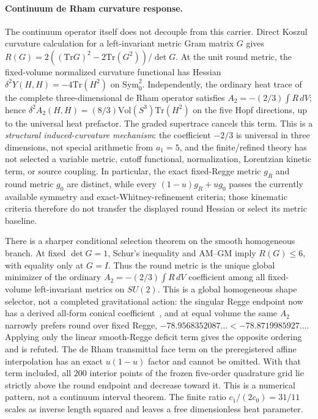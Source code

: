 \documentclass[12pt,a4paper]{article}
\theoremstyle{definition}
\begin{document}
\paragraph{Continuum de Rham curvature response.}
The continuum operator itself does not decouple from this carrier.  Direct Koszul curvature calculation for a left-invariant metric Gram matrix $G$ gives $R(G)=2((\mathrm{Tr}G)^2-2\mathrm{Tr}(G^2))/\det G$.  At the unit round metric, the fixed-volume normalized curvature functional has Hessian $\delta^2Y(H,H)=-4\mathrm{Tr}(H^2)$ on $\mathrm{Sym}^2_0$.  Independently, the ordinary heat trace of the complete three-dimensional de Rham operator satisfies $A_2=-(2/3)\int R\,dV$; hence $\delta^2A_2(H,H)=(8/3)\mathrm{Vol}(S^3)\mathrm{Tr}(H^2)$ on the five Hopf directions, up to the universal heat prefactor.  The graded supertrace cancels this term.  This is a \emph{structural induced-curvature mechanism}: the coefficient $-2/3$ is universal in three dimensions, not special arithmetic from $a_1=5$, and the finite/refined theory has not selected a variable metric, cutoff functional, normalization, Lorentzian kinetic term, or source coupling.  In particular, the exact fixed-Regge metric $g_R$ and round metric $g_0$ are distinct, while every $(1-u)g_R+ug_0$ passes the currently available symmetry and exact-Whitney-refinement criteria; those kinematic criteria therefore do not transfer the displayed round Hessian or select its metric baseline.

There is a sharper conditional selection theorem on the smooth homogeneous
branch.  At fixed $\det G=1$, Schur's inequality and AM--GM imply $R(G)\leq6$,
with equality only at $G=I$.  Thus the round metric is the unique global
minimizer of the ordinary $A_2=-(2/3)\int R\,dV$ coefficient among all
fixed-volume left-invariant metrics on $SU(2)$.  This is a global homogeneous
shape selector, not a completed gravitational action: the singular Regge
endpoint now has a derived all-form conical
coefficient~\cite{cheeger1983,fursaevmiele1997}, and at equal volume
the same $A_2$ narrowly prefers round over fixed Regge,
$-78.9568352087\ldots<-78.8719985927\ldots$.  Applying only the linear
smooth-Regge deficit term gives the opposite ordering and is refuted.  The
de Rham transmittal face term on the preregistered affine interpolation has an
exact $u(1-u)$ factor and cannot be omitted.  With that term included, all
$200$ interior points of the frozen five-order quadrature grid lie strictly
above the round endpoint and decrease toward it.  This is a numerical pattern,
not a continuum interval theorem.  The finite ratio
$c_1/(2c_0)=31/11$ scales as inverse length squared and leaves a free
dimensionless heat parameter.
\end{document}
